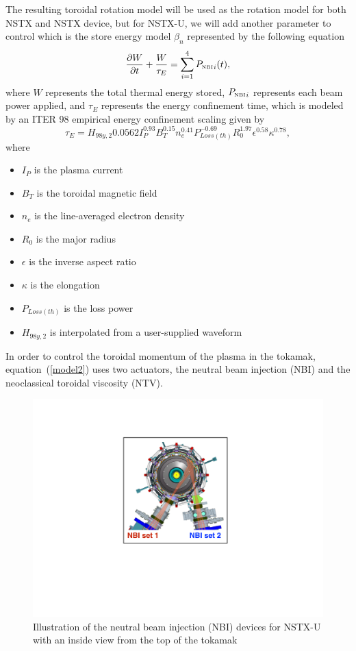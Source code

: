 \documentclass[12pt,lot, lof]{puthesis}
\begin{document}
The resulting toroidal rotation model will be used as the rotation model for both NSTX and NSTX device, but for NSTX-U, we will add another parameter to control which is the store energy model $\beta_n$ represented by the following equation
\begin{equation}
\frac{\partial W}{\partial t}
   + \frac{W}{\tau_E}  =\sum_{i=1}^{4}{P_\textrm{\tiny{NBI}}}_i(t),
\label{model4}
\end{equation}
where $W$ represents the total thermal energy stored, ${P_\textrm{\tiny{NBI}}}_i$ represents each beam power applied, and ${\tau_E} $ represents the energy confinement time, which is modeled by an ITER 98 empirical energy confinement scaling \cite{Iter99} given by
\begin{equation}
\tau_E = H_{98y,2} 0.0562 I_{P}^{0.93} B_{T}^{0.15} n_{e}^{0.41} P_{Loss(th)}^{-0.69} R_{0}^{1.97} {\epsilon}^{0.58} \kappa^{0.78},
\end{equation}
where
\begin{itemize}
\item $I_P$ is the plasma current
\item $B_T$ is the toroidal magnetic field
\item $n_e$ is the line-averaged electron density 
\item $R_0$ is the major radius
\item $\epsilon$ is the inverse aspect ratio
\item $\kappa$ is the elongation
\item $P_{Loss(th)}$ is the loss power
\item $H_{98y,2} $ is interpolated from a user-supplied waveform
\end{itemize}

In order to control the toroidal momentum of the plasma in the tokamak, equation~(\ref{model2}) uses two actuators, the neutral beam injection (NBI) and the neoclassical toroidal viscosity (NTV). 

\begin{figure}
\centering
\includegraphics[width=0.6\linewidth]{nnbbii}
\caption{Illustration of the neutral beam injection (NBI) devices for NSTX-U with an inside view from the top of the tokamak }
\label{figmod6}
\end{figure}
\end{document}
